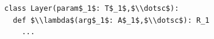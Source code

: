 \documentclass[border=10pt]{standalone}
\begin{document}
\begin{lstlisting}
class Layer(param$_1$: T$_1$,$\\dotsc$):
  def $\\lambda$(arg$_1$: A$_1$,$\\dotsc$): R_1
    ...
\end{lstlisting}
\end{document}
